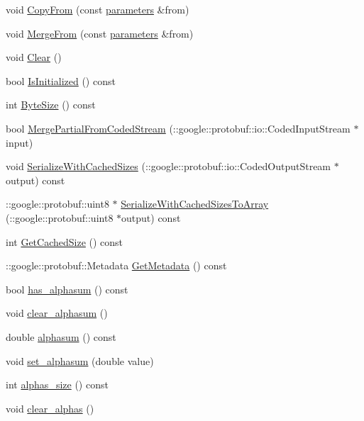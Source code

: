 \begin{DoxyCompactItemize}
void \hyperlink{class_l_d_a_1_1parameters_aced52857cb4b43b1a500ef9f686bbfda}{CopyFrom} (const \hyperlink{class_l_d_a_1_1parameters}{parameters} \&from)
\item 
void \hyperlink{class_l_d_a_1_1parameters_a781123f6e083dae2ddb63224333cea7f}{MergeFrom} (const \hyperlink{class_l_d_a_1_1parameters}{parameters} \&from)
\item 
void \hyperlink{class_l_d_a_1_1parameters_ae6370dae7b768dedcb10eddf0825ae31}{Clear} ()
\item 
bool \hyperlink{class_l_d_a_1_1parameters_ada355a874a7d9181736896ae31e61cce}{IsInitialized} () const 
\item 
int \hyperlink{class_l_d_a_1_1parameters_a75234a8f86a1b11c91ff085872188f14}{ByteSize} () const 
\item 
bool \hyperlink{class_l_d_a_1_1parameters_a01f7a58cf08755a24b0c8638e43c4640}{MergePartialFromCodedStream} (::google::protobuf::io::CodedInputStream $\ast$input)
\item 
void \hyperlink{class_l_d_a_1_1parameters_ae7bf0cb7d3fe6194a5cacb14be149c25}{SerializeWithCachedSizes} (::google::protobuf::io::CodedOutputStream $\ast$output) const 
\item 
::google::protobuf::uint8 $\ast$ \hyperlink{class_l_d_a_1_1parameters_ab24e2725db95a360ffbcbbd390051232}{SerializeWithCachedSizesToArray} (::google::protobuf::uint8 $\ast$output) const 
\item 
int \hyperlink{class_l_d_a_1_1parameters_a2e64015d79045c906f04e0030cf19215}{GetCachedSize} () const 
\item 
::google::protobuf::Metadata \hyperlink{class_l_d_a_1_1parameters_a2b1e2cddb1825734d64c66ac89512a54}{GetMetadata} () const 
\item 
bool \hyperlink{class_l_d_a_1_1parameters_aed24909e1f195c18f9fe3425f09dda69}{has\_\-alphasum} () const 
\item 
void \hyperlink{class_l_d_a_1_1parameters_ae528875970511c508f159074dcd3f25f}{clear\_\-alphasum} ()
\item 
double \hyperlink{class_l_d_a_1_1parameters_a71b5fa810d39c3b59df5edb6c67a2a7f}{alphasum} () const 
\item 
void \hyperlink{class_l_d_a_1_1parameters_ae01bd631c78306253ffaedc35ff82f27}{set\_\-alphasum} (double value)
\item 
int \hyperlink{class_l_d_a_1_1parameters_ae423748d74bfdf74e56d1b8cc65058f9}{alphas\_\-size} () const 
\item 
void \hyperlink{class_l_d_a_1_1parameters_a373f9c4f33664861adfee5a16a64fe9b}{clear\_\-alphas} ()

\end{DoxyCompactItemize}

